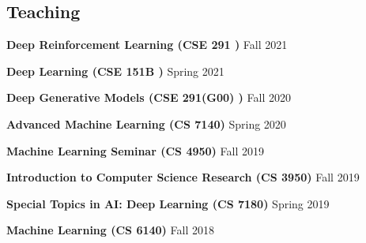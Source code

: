 \documentclass[margin,line]{res}
\begin{document}
\begin{resume}
 

\section{\sc Teaching }
 {\bf Deep Reinforcement Learning   (CSE 291 )}   \hfill  {Fall 2021} 


 {\bf Deep Learning   (CSE 151B )}   \hfill  {Spring 2021} 


 {\bf Deep Generative Models  (CSE 291(G00) )}   \hfill  {Fall 2020} 



 {\bf Advanced Machine Learning  (CS 7140)}   \hfill  { Spring 2020} 


 {\bf Machine Learning Seminar (CS 4950)}   \hfill  { Fall 2019} 

 {\bf Introduction to Computer Science Research (CS 3950)}   \hfill  { Fall 2019} 
 
 {\bf Special Topics in AI: Deep Learning (CS 7180)}   \hfill  { Spring 2019} 


 {\bf Machine Learning (CS 6140)}   \hfill  { Fall 2018 } 


% 
 
% 
% 




\end{resume}
\end{document}
